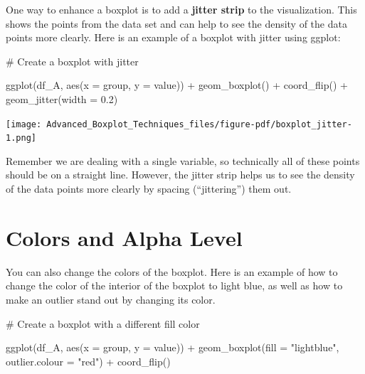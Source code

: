 \documentclass[
  letterpaper,
  DIV=11,
  numbers=noendperiod]{scrreprt}
\newenvironment{Shaded}{\begin{snugshade}}{\end{snugshade}}
\newcommand{\AttributeTok}[1]{\textcolor[rgb]{0.40,0.45,0.13}{#1}}
\newcommand{\CommentTok}[1]{\textcolor[rgb]{0.37,0.37,0.37}{#1}}
\newcommand{\FloatTok}[1]{\textcolor[rgb]{0.68,0.00,0.00}{#1}}
\newcommand{\FunctionTok}[1]{\textcolor[rgb]{0.28,0.35,0.67}{#1}}
\newcommand{\NormalTok}[1]{\textcolor[rgb]{0.00,0.23,0.31}{#1}}
\newcommand{\SpecialCharTok}[1]{\textcolor[rgb]{0.37,0.37,0.37}{#1}}
\newcommand{\StringTok}[1]{\textcolor[rgb]{0.13,0.47,0.30}{#1}}
\begin{document}

One way to enhance a boxplot is to add a \textbf{jitter strip} to the
visualization. This shows the points from the data set and can help to
see the density of the data points more clearly. Here is an example of a
boxplot with jitter using ggplot:

\begin{Shaded}
\begin{Highlighting}[]
\CommentTok{\# Create a boxplot with jitter}

\FunctionTok{ggplot}\NormalTok{(df\_A, }\FunctionTok{aes}\NormalTok{(}\AttributeTok{x =}\NormalTok{ group, }\AttributeTok{y =}\NormalTok{ value)) }\SpecialCharTok{+}
  \FunctionTok{geom\_boxplot}\NormalTok{() }\SpecialCharTok{+}
  \FunctionTok{coord\_flip}\NormalTok{() }\SpecialCharTok{+}
  \FunctionTok{geom\_jitter}\NormalTok{(}\AttributeTok{width =} \FloatTok{0.2}\NormalTok{)}
\end{Highlighting}
\end{Shaded}

\begin{center}
\texttt{[image: Advanced\_Boxplot\_Techniques\_files/figure-pdf/boxplot\_jitter-1.png]}
\end{center}

Remember we are dealing with a single variable, so technically all of
these points should be on a straight line. However, the jitter strip
helps us to see the density of the data points more clearly by spacing
(``jittering'') them out.

\section*{Colors and Alpha Level}\label{colors-and-alpha-level}


You can also change the colors of the boxplot. Here is an example of how
to change the color of the interior of the boxplot to light blue, as
well as how to make an outlier stand out by changing its color.

\begin{Shaded}
\begin{Highlighting}[]
\CommentTok{\# Create a boxplot with a different fill color}

\FunctionTok{ggplot}\NormalTok{(df\_A, }\FunctionTok{aes}\NormalTok{(}\AttributeTok{x =}\NormalTok{ group, }\AttributeTok{y =}\NormalTok{ value)) }\SpecialCharTok{+}
  \FunctionTok{geom\_boxplot}\NormalTok{(}\AttributeTok{fill =} \StringTok{"lightblue"}\NormalTok{, }\AttributeTok{outlier.colour =} \StringTok{"red"}\NormalTok{) }\SpecialCharTok{+}
  \FunctionTok{coord\_flip}\NormalTok{()}
\end{Highlighting}
\end{Shaded}
\end{document}
